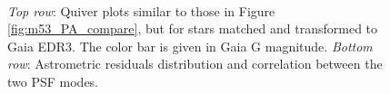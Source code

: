 \documentclass[]{spie}  %
\begin{document}
\begin{figure}[!h]
  \centering
  \\
  \hspace{-1cm}
  \caption{\textit{Top row}: Quiver plots similar to those in Figure \ref{fig:m53_PA_compare}, but for stars matched and transformed to Gaia EDR3. The color bar is given in Gaia G magnitude. \textit{Bottom row}: Astrometric residuals distribution and correlation between the two PSF modes.} \label{fig:m53_PA_compare_gaia}
\end{figure}
\end{document}
